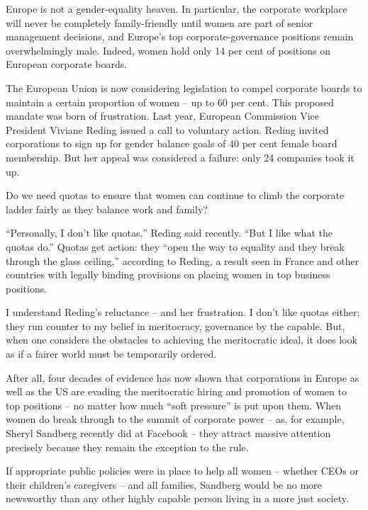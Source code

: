 Europe is not a gender-equality heaven. In particular, the corporate workplace will never be completely family-friendly until women are part of senior management decisions, and Europe's top corporate-governance positions remain overwhelmingly male. Indeed, women hold only 14 per cent of positions on European corporate boards.


The European Union is now considering legislation to compel corporate boards to maintain a certain proportion of women – up to 60 per cent. This proposed mandate was born of frustration. Last year, European Commission Vice President Viviane Reding issued a call to voluntary action. Reding invited corporations to sign up for gender balance goals of 40 per cent female board membership. But her appeal was considered a failure: only 24 companies took it up.


Do we need quotas to ensure that women can continue to climb the corporate ladder fairly as they balance work and family?


``Personally, I don't like quotas,'' Reding said recently. ``But I like what the quotas do.'' Quotas get action: they ``open the way to equality and they break through the glass ceiling,'' according to Reding, a result seen in France and other countries with legally binding provisions on placing women in top business positions.


I understand Reding's reluctance – and her frustration. I don't like quotas either; they run counter to my belief in meritocracy, governance by the capable. But, when one considers the obstacles to achieving the meritocratic ideal, it does look as if a fairer world must be temporarily ordered.


After all, four decades of evidence has now shown that corporations in Europe as well as the US are evading the meritocratic hiring and promotion of women to top positions – no matter how much ``soft pressure'' is put upon them. When women do break through to the summit of corporate power – as, for example, Sheryl Sandberg recently did at Facebook – they attract massive attention precisely because they remain the exception to the rule.


If appropriate public policies were in place to help all women – whether CEOs or their children's caregivers – and all families, Sandberg would be no more newsworthy than any other highly capable person living in a more just society.



